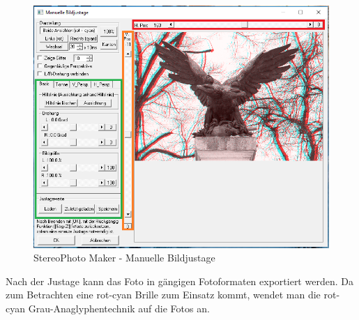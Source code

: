 \documentclass[liststotoc,bibtotoc,fontsize=14pt,]{scrreprt}
\begin{document}
		\begin{figure}[H]
			\includegraphics[width=\linewidth]{img/steps/step4.png}
			\caption{StereoPhoto Maker - Manuelle Bildjustage}
			\label{img:maker_manual}
		\end{figure}
	
		Nach der Justage kann das Foto in gängigen Fotoformaten exportiert werden. Da zum Betrachten eine rot-cyan Brille zum Einsatz kommt, wendet man die rot-cyan Grau-Anaglyphentechnik auf die Fotos an.

	
\end{document}
